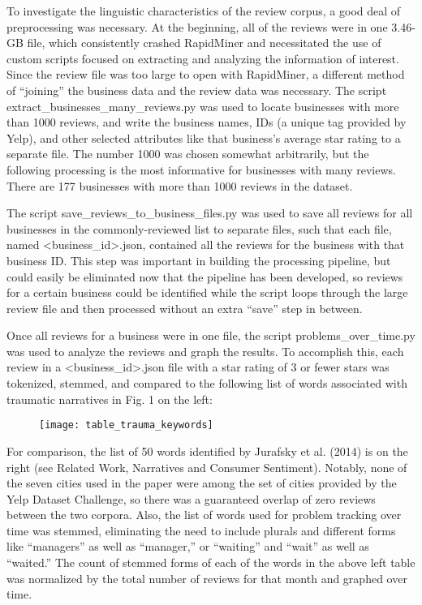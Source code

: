 \quad To investigate the linguistic characteristics of the review corpus, a good deal of preprocessing was necessary. At the beginning, all of the reviews were in one 3.46-GB file, which consistently crashed RapidMiner and necessitated the use of custom scripts focused on extracting and analyzing the information of interest. Since the review file was too large to open with RapidMiner, a different method of “joining” the business data and the review data was necessary. The script extract_businesses_many_reviews.py was used to locate businesses with more than 1000 reviews, and write the business names, IDs (a unique tag provided by Yelp), and other selected attributes like that business’s average star rating to a separate file. The number 1000 was chosen somewhat arbitrarily, but the following processing is the most informative for businesses with many reviews. There are 177 businesses with more than 1000 reviews in the dataset.

\quad The script save_reviews_to_business_files.py was used to save all reviews for all businesses in the commonly-reviewed list to separate files, such that each file, named <business_id>.json, contained all the reviews for the business with that business ID. This step was important in building the processing pipeline, but could easily be eliminated now that the pipeline has been developed, so reviews for a certain business could be identified while the script loops through the large review file and then processed without an extra “save” step in between.

\quad Once all reviews for a business were in one file, the script problems_over_time.py was used to analyze the reviews and graph the results. To accomplish this, each review in a <business_id>.json file with a star rating of 3 or fewer stars was tokenized, stemmed, and compared to the following list of words associated with traumatic narratives in Fig. 1 on the left:

\begin{figure}[h]
\texttt{[image: table\_trauma\_keywords]}
\end{figure}

\quad For comparison, the list of 50 words identified by Jurafsky et al. (2014) is on the right (see Related Work, Narratives and Consumer Sentiment). Notably, none of the seven cities used in the paper were among the set of cities provided by the Yelp Dataset Challenge, so there was a guaranteed overlap of zero reviews between the two corpora. Also, the list of words used for problem tracking over time was stemmed, eliminating the need to include plurals and different forms like “managers” as well as “manager,” or “waiting” and “wait” as well as “waited.” The count of stemmed forms of each of the words in the above left table was normalized by the total number of reviews for that month and graphed over time.

